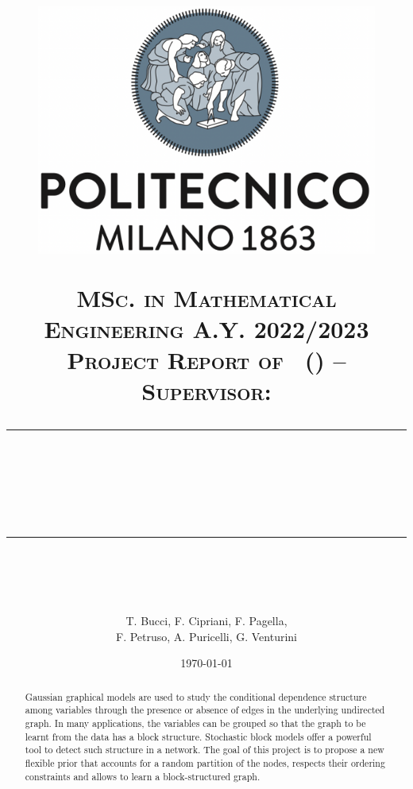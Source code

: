 \documentclass{article}
\title{
    \begin{figure}[htpb]
        \centering
        \includegraphics[scale=0.2]{images/logo-polimi}
    \end{figure}
    \normalfont \normalsize 
    \textsc{MSc. in Mathematical Engineering A.Y. 2022/2023\\ 
    Project Report of \coursename\ (\coursecode) -- \courseprof \\
    Supervisor: \coursesupervisor} \\
    [10pt] 
    \rule{\linewidth}{0.5pt} \\ [6pt] 
    \huge \papertitle \\
    \rule{\linewidth}{2pt}  \\ [10pt]
}
\author{T. Bucci, F. Cipriani, F. Pagella,\\ F. Petruso, A. Puricelli, G. Venturini}
\date{\normalsize \today}
\begin{document}
\maketitle


\begin{abstract} %
Gaussian graphical models are used to study the conditional dependence structure among variables through the presence or absence of edges in the underlying undirected graph. In many applications, the variables can be grouped so that the graph to be learnt from the data has a block structure. Stochastic block models offer a powerful tool to detect such structure in a network. The goal of this project is to propose a new flexible prior that accounts for a random partition of the nodes, respects their ordering constraints and allows to learn a block-structured graph.
\end{abstract}

\clearpage

\tableofcontents

    


% 

\nocite{*}
\printbibliography
\end{document}

